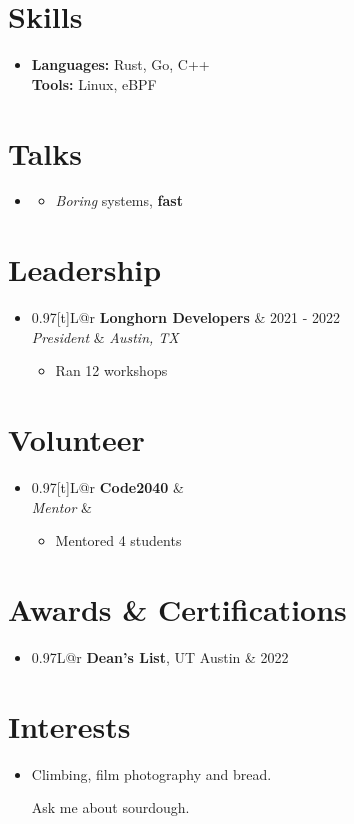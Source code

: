 \documentclass[letterpaper,11pt]{article}
\makeatletter
\newcommand{\resumeItem}[1]{
  \item\small{
    {#1 \vspace{-2pt}}
  }
}
\newcommand{\resumeSubheading}[4]{
  \vspace{-2pt}\item
    \begin{tabularx}{0.97\textwidth}[t]{L@{\hspace{0.8em}}r}
      \textbf{#1} & #2 \\
      \textit{\small#3} & \textit{\small #4} \\
    \end{tabularx}\vspace{-7pt}
}
\newcommand{\resumeProjectHeading}[2]{
    \item
    \begin{tabularx}{0.97\textwidth}{L@{\hspace{0.8em}}r}
      \small#1 & #2 \\
    \end{tabularx}\vspace{-7pt}
}
\newcommand{\resumeSubHeadingListStart}{\begin{itemize}[leftmargin=0.15in, label={}]}
\newcommand{\resumeSubHeadingListEnd}{\end{itemize}}
\newcommand{\resumeItemListStart}{\begin{itemize}}
\newcommand{\resumeItemListEnd}{\end{itemize}\vspace{-5pt}}
\newcommand{\resumeTextStart}{\begin{itemize}[leftmargin=0.15in, label={}, parsep=0.6em]\item\relax}
\newcommand{\resumeTextEnd}{\end{itemize}}
\makeatother
\begin{document}
\section{Skills}
  \resumeTextStart\small
    \textbf{Languages:} {Rust, Go, C++} \\
    \textbf{Tools:} {Linux, eBPF}
  \resumeTextEnd

\section{Talks}
  \resumeSubHeadingListStart
    \item
      \resumeItemListStart
        \resumeItem{\textit{Boring} systems, \textbf{fast}}
      \resumeItemListEnd
  \resumeSubHeadingListEnd

\section{Leadership}
  \resumeSubHeadingListStart
    \resumeSubheading
      {Longhorn Developers}{2021 - 2022}
      {President}{Austin, TX}
      \resumeItemListStart
        \resumeItem{Ran 12 workshops}
      \resumeItemListEnd
  \resumeSubHeadingListEnd

\section{Volunteer}
  \resumeSubHeadingListStart
    \resumeSubheading
      {Code2040}{}
      {Mentor}{}
      \resumeItemListStart
        \resumeItem{Mentored 4 students}
      \resumeItemListEnd
  \resumeSubHeadingListEnd

\section{Awards \& Certifications}
  \resumeSubHeadingListStart
    \resumeProjectHeading
      {\textbf{Dean's List}, UT Austin}{2022}
  \resumeSubHeadingListEnd

\section{Interests}
  \resumeTextStart
    Climbing, film photography\newline
    and bread.

    Ask me about sourdough.
  \resumeTextEnd
\end{document}
